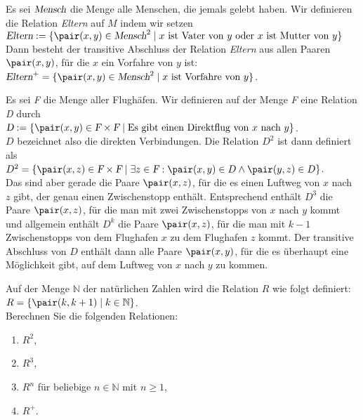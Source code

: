 \example
Es sei $\textsl{Mensch}$ die Menge alle Menschen, die jemals gelebt haben.  Wir definieren
die Relation \textsl{Eltern} auf $M$ indem wir setzen
\\[0.2cm]
\hspace*{1.3cm}
$\textsl{Eltern} := \{ \pair(x,y) \in \textsl{Mensch}^2 \mid \mbox{$x$ ist Vater von $y$ oder 
                                                                   $x$ ist Mutter von $y$} \}$
\\[0.2cm]
Dann besteht der transitive Abschluss der Relation \textsl{Eltern} aus allen Paaren
$\pair(x,y)$, f\"{u}r die $x$ ein Vorfahre von $y$ ist:
\\[0.2cm]
\hspace*{1.3cm}
$\textsl{Eltern}^+ = \{ \pair(x,y) \in \textsl{Mensch}^2 \mid \mbox{$x$ ist Vorfahre von $y$} \}$.
\next

\example
Es sei \textsl{F} die Menge aller Flugh\"{a}fen.  Wir definieren auf der Menge \textsl{F} eine
Relation \textsl{D} durch
\\[0.2cm]
\hspace*{1.3cm}
$\textsl{D} := \{ \pair(x,y) \in \textsl{F} \times \textsl{F} \mid
                  \mbox{Es gibt einen Direktflug von $x$ nach $y$} \}$.
\\[0.2cm]
$D$ bezeichnet also die direkten Verbindungen.  Die Relation $D^2$ ist dann definiert als
\\[0.2cm]
\hspace*{1.3cm}
$D^2 = \{ \pair(x,z) \in \textsl{F} \times \textsl{F} \mid 
          \exists z \in \textsl{F}: \pair(x,y) \in D \wedge \pair(y,z) \in D \}$.
\\[0.2cm]
Das sind aber gerade die Paare $\pair(x,z)$, f\"{u}r die es einen Luftweg von $x$ nach $z$
gibt, der genau einen Zwischenstopp enth\"{a}lt.  Entsprechend enth\"{a}lt $D^3$ die Paare
$\pair(x,z)$, f\"{u}r die man mit zwei Zwischenstopps von $x$ nach $y$ kommt und allgemein
enth\"{a}lt $D^k$ die Paare $\pair(x,z)$, f\"{u}r die man mit $k-1$ Zwischenstopps von dem
Flughafen $x$ zu dem Flughafen $z$ kommt.
Der transitive Abschluss von $D$ enth\"{a}lt
dann alle Paare $\pair(x,y)$, f\"{u}r die es \"{u}berhaupt eine M\"{o}glichkeit gibt, auf dem Luftweg
von $x$ nach $y$ zu kommen.

\exercise
Auf der Menge $\mathbb{N}$ der nat\"{u}rlichen Zahlen wird die Relation $R$ wie folgt definiert:
\\[0.2cm]
\hspace*{1.3cm}
$R = \{ \pair(k, k + 1) \mid k \in \mathbb{N} \}$.
\\[0.2cm]
Berechnen Sie die folgenden Relationen:
\begin{enumerate}
\item $R^2$,
\item $R^3$,
\item $R^n$ f\"{u}r beliebige $n \in \mathbb{N}$ mit $n \geq 1$,
\item $R^+$.
\end{enumerate}


